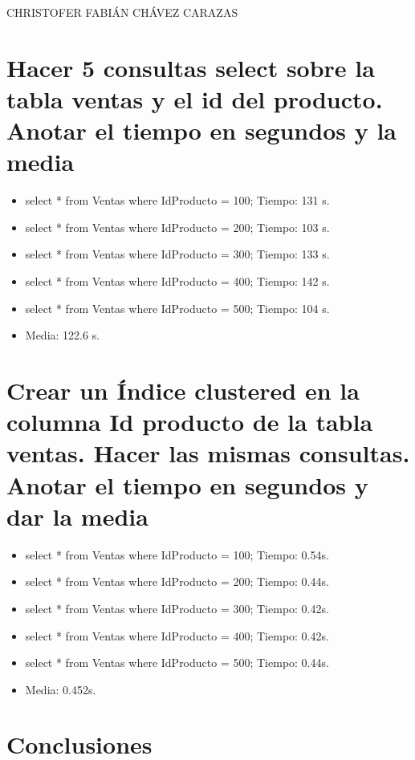 \documentclass[a4paper,12pt]{article}
\begin{document}
\begin{LARGE}
 CHRISTOFER FABIÁN CHÁVEZ CARAZAS
\end{LARGE}


  \section{Hacer 5 consultas select sobre la tabla ventas y el id del producto. Anotar el tiempo en segundos y la media}
  
  \begin{itemize}
   \item select * from Ventas where IdProducto = 100; Tiempo: 131 s.
   \item select * from Ventas where IdProducto = 200; Tiempo: 103 s.
   \item select * from Ventas where IdProducto = 300; Tiempo: 133 s.
   \item select * from Ventas where IdProducto = 400; Tiempo: 142 s.
   \item select * from Ventas where IdProducto = 500; Tiempo: 104 s.
   \item Media: 122.6 s.
  \end{itemize}

  \section{Crear un Índice clustered en la columna Id producto de la tabla ventas. Hacer las mismas consultas. Anotar el tiempo
  en segundos y dar la media}
  
  \begin{itemize}
   \item select * from Ventas where IdProducto = 100; Tiempo: 0.54s.
   \item select * from Ventas where IdProducto = 200; Tiempo: 0.44s.
   \item select * from Ventas where IdProducto = 300; Tiempo: 0.42s.
   \item select * from Ventas where IdProducto = 400; Tiempo: 0.42s.
   \item select * from Ventas where IdProducto = 500; Tiempo: 0.44s.
   \item Media: 0.452s.
  \end{itemize}
  
  \section{Conclusiones}
  
\end{document}
